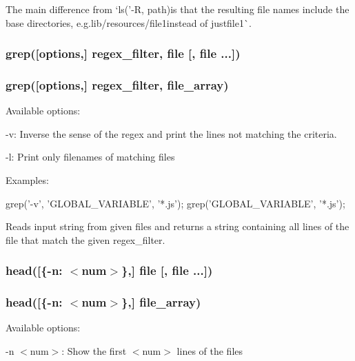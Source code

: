 The main difference from `ls('-\/R\textquotesingle{}, path){\ttfamily is that the resulting file names include the base directories, e.\+g.}lib/resources/file1{\ttfamily instead of just}file1\`{}.

\subsubsection*{grep(\mbox{[}options,\mbox{]} regex\+\_\+filter, file \mbox{[}, file ...\mbox{]})}

\subsubsection*{grep(\mbox{[}options,\mbox{]} regex\+\_\+filter, file\+\_\+array)}

Available options\+:


\begin{DoxyItemize}
\item {\ttfamily -\/v}\+: Inverse the sense of the regex and print the lines not matching the criteria.
\item {\ttfamily -\/l}\+: Print only filenames of matching files
\end{DoxyItemize}

Examples\+:


\begin{DoxyCode}
grep('-v', 'GLOBAL\_VARIABLE', '*.js');
grep('GLOBAL\_VARIABLE', '*.js');
\end{DoxyCode}


Reads input string from given files and returns a string containing all lines of the file that match the given {\ttfamily regex\+\_\+filter}.

\subsubsection*{head(\mbox{[}\{\textquotesingle{}-\/n\textquotesingle{}\+: $<$num$>$\},\mbox{]} file \mbox{[}, file ...\mbox{]})}

\subsubsection*{head(\mbox{[}\{\textquotesingle{}-\/n\textquotesingle{}\+: $<$num$>$\},\mbox{]} file\+\_\+array)}

Available options\+:


\begin{DoxyItemize}
\item {\ttfamily -\/n $<$num$>$}\+: Show the first {\ttfamily $<$num$>$} lines of the files
\end{DoxyItemize}


